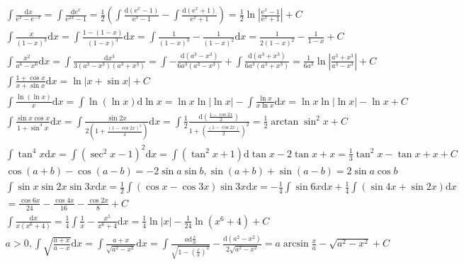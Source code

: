 \documentclass{article}
\begin{document}
\clearpage 
\begin{align*}
    \int \frac{\mathrm{d}x}{\mathrm{e}^x - \mathrm{e}^{-x} } = \int \frac{\mathrm{d}\mathrm{e}^x}{\mathrm{e}^{2x}-1} = \frac{1}{2} \left(\int \frac{\mathrm{d}(\mathrm{e}^x-1)}{\mathrm{e}^x-1} - \int \frac{\mathrm{d}(\mathrm{e}^x+1)}{\mathrm{e}^x+1} \right) = \frac{1}{2}\ln \left|\frac{\mathrm{e}^x-1}{\mathrm{e}^x+1}\right|+C\\
    \int \frac{x}{(1-x)^3}\mathrm{d}x = \int \frac{1-(1-x)}{(1-x)^3}\mathrm{d}x = \int \frac{1}{(1-x)^3} - \frac{1}{(1-x)^2} \mathrm{d}x = \frac{1}{2(1-x)^2} - \frac{1}{1-x} + C \\ 
    \int \frac{x^2}{a^6 - x^6} \mathrm{d}x = \int \frac{\mathrm{d}x^3}{3(a^3-x^3)(a^3+x^3)} = \int -\frac{\mathrm{d}(a^3-x^3)}{6a^3(a^3-x^3)} + \int \frac{\mathrm{d}(a^3+x^3)}{6a^3(a^3+x^3)} = \frac{1}{6a^3} \ln\left|\frac{a^3+x^3}{a^3-x^3}\right| + C \\ 
    \int \frac{1+\cos x}{x+\sin x}\mathrm{d}x = \ln|x+\sin x| + C \\ 
    \int \frac{\ln(\ln x)}{x} \mathrm{d} x = \int \ln(\ln x) \mathrm{d}\ln x = \ln x \ln|\ln x|  - \int \frac{\ln x}{x\ln x}\mathrm{d} x = \ln x \ln |\ln x | - \ln x + C \\
    \int \frac{\sin x \cos x}{1+\sin^4 x} \mathrm{d}x = \int \frac{\sin 2x}{2(1+\frac{(1-\cos 2x)^2}{4})} \mathrm{d}x = \int \frac{1}{2} \frac{\mathrm{d}(\frac{1-\cos 2x}{2})}{1+\left(\frac{(1-\cos 2x)}{2}\right)^2} = \frac{1}{2} \arctan \sin^2 x + C \\
    \int \tan^4 x \mathrm{d}x = \int (\sec^2 x - 1)^2 \mathrm{d}x  = \int (\tan^2 x+1) \mathrm{d} \tan x - 2\tan x + x = \frac{1}{3}\tan^2 x - \tan x + x + C \\
    \cos(a+b) - \cos(a-b) = -2\sin a \sin b , \sin(a+b) + \sin(a-b) = 2\sin a \cos b \\
    \int \sin x \sin 2x \sin 3x\mathrm{d}x = \frac{1}{2} \int ( \cos x - \cos 3x) \sin 3x \mathrm{d}x = - \frac{1}{4}\int \sin 6x \mathrm{d}x + \frac{1}{4} \int (\sin 4x + \sin 2x) \mathrm{d}x \\ 
    = \frac{\cos 6x}{24} - \frac{\cos 4x}{16} - \frac{\cos 2x}{8} + C \\  
    \int \frac{\mathrm{d}x}{x(x^6+4)} = \frac{1}{4} \int \frac{1}{x} - \frac{x^5}{x^6+4} \mathrm{d}x = \frac{1}{4}\ln |x| - \frac{1}{24} \ln(x^6+4) + C \\ 
    a>0 , \int \sqrt{\frac{a+x}{a-x}}\mathrm{d}x = \int \frac{a+x}{\sqrt{a^2-x^2}}\mathrm{d}x = \int\frac{a\mathrm{d}\frac{x}{a}}{\sqrt{1-\left(\frac{x}{a}\right)^2}} - \frac{\mathrm{d}(a^2-x^2)}{2\sqrt{a^2-x^2}} = a\arcsin \frac{x}{a} - \sqrt{a^2-x^2} + C \\
\end{align*}
\end{document}
